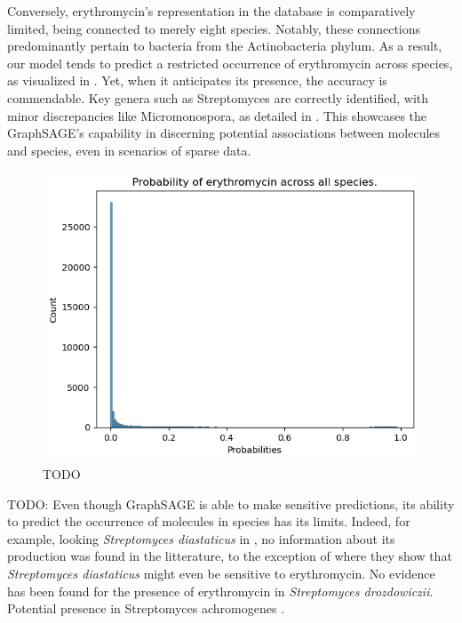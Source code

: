 \documentclass[
11pt, %
oneside, %
english, %
singlespacing, %
headsepline, %
chapterinoneline, %
]{MastersDoctoralThesis} %
\begin{document}
Conversely, erythromycin's representation in the database is comparatively limited, being connected to merely eight species. Notably, these connections predominantly pertain to bacteria from the Actinobacteria phylum. As a result, our model tends to predict a restricted occurrence of erythromycin across species, as visualized in . Yet, when it anticipates its presence, the accuracy is commendable. Key genera such as Streptomyces are correctly identified, with minor discrepancies like Micromonospora, as detailed in . This showcases the GraphSAGE's capability in discerning potential associations between molecules and species, even in scenarios of sparse data. 

\begin{figure}[h]
	\centering
	\includegraphics[scale=0.7]{figure/erythromycin_plot}
	\caption{TODO}
	\label{fig: hist erythromycin}
\end{figure}

TODO: Even though GraphSAGE is able to make sensitive predictions, its ability to predict the occurrence of molecules in species has its limits. Indeed, for example, looking \textit{Streptomyces diastaticus} in , no information about its production was found in the litterature, to the exception of \cite{graham23SRibosomalRibonucleic1979} where they show that \textit{Streptomyces diastaticus} might even be sensitive to erythromycin. No evidence has been found for the presence of erythromycin in \textit{Streptomyces drozdowiczii}. Potential presence in Streptomyces achromogenes \cite{moosawiComputationalPredictionProperties2010}.
\end{document}
